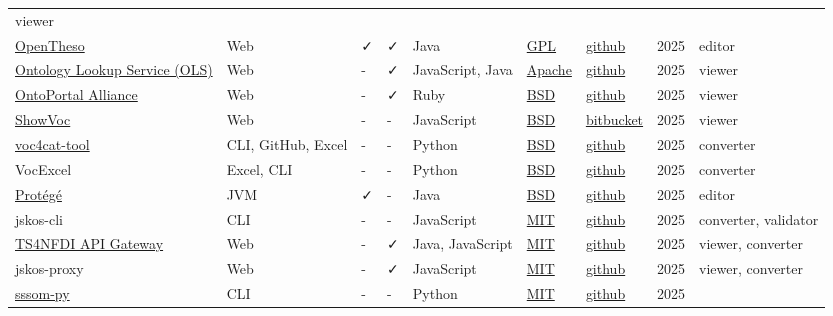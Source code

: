 \documentclass[
  DIV=10]{article}
\begin{document}
\begin{longtable}[]{@{}lllllllll@{}}
viewer \\
\href{https://opentheso.hypotheses.org/}{OpenTheso} & Web & ✓ & ✓ & Java
& \href{https://spdx.org/licenses/GPL-3.0-or-later}{GPL} &
\href{https://github.com/miledrousset/Opentheso}{github} & 2025 &
editor \\
\href{https://github.com/EBISPOT/ols4}{Ontology Lookup Service (OLS)} &
Web & - & ✓ & JavaScript, Java &
\href{https://spdx.org/licenses/Apache-2.0}{Apache} &
\href{https://github.com/EBISPOT/OLS}{github} & 2025 & viewer \\
\href{https://ontoportal.org/}{OntoPortal Alliance} & Web & - & ✓ & Ruby
& \href{https://spdx.org/licenses/BSD-3-Clause}{BSD} &
\href{https://github.com/ontoportal}{github} & 2025 & viewer \\
\href{https://showvoc.uniroma2.it/}{ShowVoc} & Web & - & - & JavaScript
& \href{https://spdx.org/licenses/BSD-3-Clause}{BSD} &
\href{https://bitbucket.org/art-uniroma2/showvoc/src/master/}{bitbucket}
& 2025 & viewer \\
\href{https://github.com/nfdi4cat/voc4cat-tool/}{voc4cat-tool} & CLI,
GitHub, Excel & - & - & Python &
\href{https://spdx.org/licenses/BSD-3-Clause}{BSD} &
\href{https://github.com/nfdi4cat/voc4cat-tool/}{github} & 2025 &
converter \\
VocExcel & Excel, CLI & - & - & Python &
\href{https://spdx.org/licenses/BSD-3-Clause}{BSD} &
\href{https://github.com/Kurrawong/VocExcel}{github} & 2025 &
converter \\
\href{https://protege.stanford.edu/}{Protégé} & JVM & ✓ & - & Java &
\href{https://spdx.org/licenses/BSD-3-Clause}{BSD} &
\href{https://github.com/protegeproject/protege}{github} & 2025 &
editor \\
jskos-cli & CLI & - & - & JavaScript &
\href{https://spdx.org/licenses/MIT}{MIT} &
\href{https://github.com/gbv/jskos-cli/}{github} & 2025 & converter,
validator \\
\href{https://ts4nfdi.github.io/api-gateway/}{TS4NFDI API Gateway} & Web
& - & ✓ & Java, JavaScript & \href{https://spdx.org/licenses/MIT}{MIT} &
\href{https://github.com/ts4nfdi/api-gateway}{github} & 2025 & viewer,
converter \\
jskos-proxy & Web & - & ✓ & JavaScript &
\href{https://spdx.org/licenses/MIT}{MIT} &
\href{https://github.com/gbv/jskos-proxy/}{github} & 2025 & viewer,
converter \\
\href{https://mapping-commons.github.io/sssom-py}{sssom-py} & CLI & - &
- & Python & \href{https://spdx.org/licenses/MIT}{MIT} &
\href{https://github.com/mapping-commons/sssom-py}{github} & 2025 &

\end{longtable}
\end{document}
